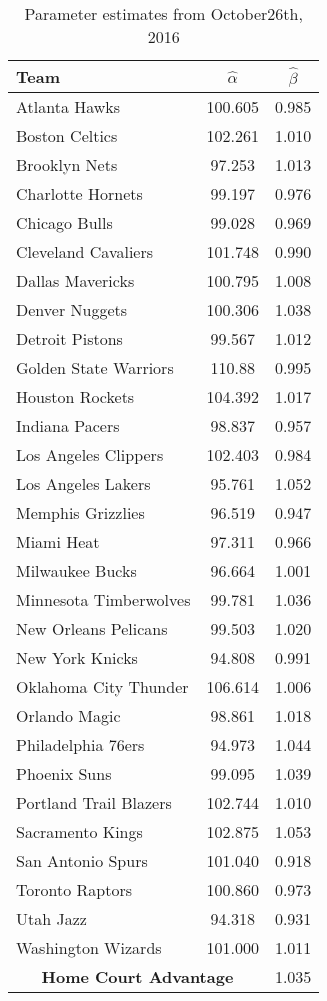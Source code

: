 \begin{table}[t]
	\centering
	\caption{Parameter estimates from October26th, 2016}
	\begin{tabular}{|l|c|c|}
		\hline
		\textbf{Team}  & \textbf{$\hat{\alpha}$} & \textbf{$\hat{\beta}$} \\ \hline
		Atlanta Hawks  & 100.605 & 0.985\\ \hline
		Boston Celtics & 102.261 & 1.010\\ \hline
		Brooklyn Nets  & 97.253 & 1.013\\ \hline
		Charlotte Hornets & 99.197 & 0.976\\ \hline
		Chicago Bulls & 99.028 & 0.969\\ \hline
		Cleveland Cavaliers & 101.748 & 0.990\\ \hline
		Dallas Mavericks & 100.795 & 1.008 \\ \hline
		Denver Nuggets & 100.306 & 1.038\\ \hline
		Detroit Pistons & 99.567 & 1.012\\ \hline
		Golden State Warriors & 110.88 & 0.995\\ \hline
		Houston Rockets & 104.392 & 1.017 \\ \hline
		Indiana Pacers & 98.837 & 0.957 \\ \hline
		Los Angeles Clippers & 102.403 & 0.984\\ \hline
		Los Angeles Lakers & 95.761 & 1.052 \\ \hline
		Memphis Grizzlies & 96.519 & 0.947\\ \hline
		Miami Heat & 97.311 & 0.966\\ \hline
		Milwaukee Bucks &96.664 & 1.001\\ \hline
		Minnesota Timberwolves & 99.781 & 1.036\\ \hline
		New Orleans Pelicans & 99.503 & 1.020\\ \hline
		New York Knicks & 94.808 & 0.991\\ \hline
		Oklahoma City Thunder & 106.614 & 1.006\\ \hline
		Orlando Magic & 98.861 & 1.018\\ \hline
		Philadelphia 76ers & 94.973 & 1.044\\ \hline
		Phoenix Suns & 99.095 & 1.039\\ \hline
		Portland Trail Blazers & 102.744 & 1.010\\ \hline
		Sacramento Kings & 102.875 & 1.053\\ \hline
		San Antonio Spurs & 101.040 & 0.918\\ \hline
		Toronto Raptors & 100.860 & 0.973 \\ \hline
		Utah Jazz & 94.318 & 0.931\\ \hline
		Washington Wizards & 101.000 & 1.011\\ \hline
		\multicolumn{2}{|c|}{\textbf{Home Court Advantage}} & 1.035\\ \hline
	\end{tabular}
	\label{table:dc_oct2016}
\end{table}

